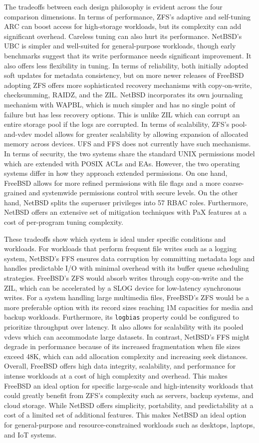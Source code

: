 The tradeoffs between each design philosophy is evident across the four comparison dimensions. In terms of performance, ZFS's
adaptive and self-tuning ARC can boost access for high-storage workloads, but its complexity can add significant overhead.
Careless tuning can also hurt its performance. NetBSD's UBC is simpler and well-suited for general-purpose workloads, though
early benchmarks suggest that its write performance needs significant improvement. It also offers less flexibility in tuning.
In terms of reliability, both initially adopted soft updates for metadata consistency, but on more newer releases of FreeBSD
adopting ZFS offers more sophisticated recovery mechanisms with copy-on-write, checksumming, RAIDZ, and the ZIL. NetBSD
incorporates its own journaling mechanism with WAPBL, which is much simpler and has no single point of failure but has less recovery options.
This is unlike ZIL which can corrupt an entire storage pool if the logs are corrupted. In terms of scalability, ZFS's pool-and-vdev
model allows for greater scalability by allowing expansion of allocated memory across devices. UFS and FFS does not currently
have such mechanisms. In terms of security, the two systems share the standard UNIX permissions model which are extended
with POSIX ACLs and EAs. However, the two operating systems differ in how they approach extended permissions. On one hand,
FreeBSD allows for more refined permissions with file flags and a more coarse-grained and systemwide permissions control
with secure levels. On the other hand, NetBSD splits the superuser privileges into 57 RBAC roles. Furthermore, NetBSD offers
an extensive set of mitigation techniques with PaX features at a cost of per-program tuning complexity.

These tradeoffs show which system is ideal under specific conditions and workloads. For workloads that perform frequent
file writes such as a logging system, NetBSD's FFS ensures data corruption by
committing metadata logs and handles predictable I/O with minimal overhead with its buffer queue scheduling strategies.
FreeBSD's ZFS would absorb writes through copy-on-write and the ZIL, which can be accelerated by a SLOG device for low-latency
synchronous writes. For a system handling large multimedia files, FreeBSD's ZFS would be a more preferable option with its
record sizes reaching 1M capacities for media and backup workloads. Furthermore, its \texttt{logbias} property could be
configured to prioritize throughput over latency. It also allows for scalability with its pooled vdevs which can accommodate
large datasets. In contrast, NetBSD's FFS might degrade in performance because of its increased fragmentation when file
sizes exceed 48K, which can add allocation complexity and increasing seek distances. Overall, FreeBSD offers high data integrity,
scalability, and performance for intense workloads at a cost of high complexity and overhead. This makes FreeBSD an ideal
option for specific large-scale and high-intensity workloads that could greatly benefit from ZFS's complexity such as servers,
backup systems, and cloud storage. While NetBSD offers simplicity, portability, and predictability at a cost of a limited set of
additional features. This makes NetBSD an ideal option for general-purpose and resource-constrained workloads such as desktops,
laptops, and IoT systems.
